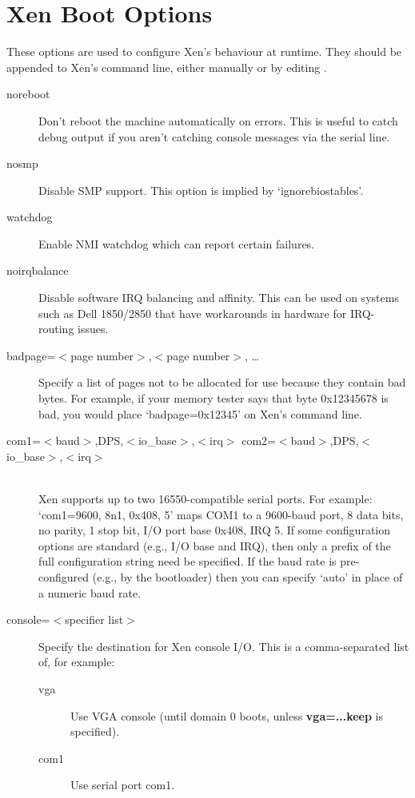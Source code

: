 \documentclass[11pt,twoside,final,openright]{report}
\begin{document}
\section{Xen Boot Options}
\label{s:xboot}

These options are used to configure Xen's behaviour at runtime.  They
should be appended to Xen's command line, either manually or by
editing .

\begin{description}
\item [ noreboot ] Don't reboot the machine automatically on errors.
  This is useful to catch debug output if you aren't catching console
  messages via the serial line.
\item [ nosmp ] Disable SMP support.  This option is implied by
  `ignorebiostables'.
\item [ watchdog ] Enable NMI watchdog which can report certain
  failures.
\item [ noirqbalance ] Disable software IRQ balancing and affinity.
  This can be used on systems such as Dell 1850/2850 that have
  workarounds in hardware for IRQ-routing issues.
\item [ badpage=$<$page number$>$,$<$page number$>$, \ldots ] Specify
  a list of pages not to be allocated for use because they contain bad
  bytes. For example, if your memory tester says that byte 0x12345678
  is bad, you would place `badpage=0x12345' on Xen's command line.
\item [ com1=$<$baud$>$,DPS,$<$io\_base$>$,$<$irq$>$
  com2=$<$baud$>$,DPS,$<$io\_base$>$,$<$irq$>$ ] \mbox{}\\
  Xen supports up to two 16550-compatible serial ports.  For example:
  `com1=9600, 8n1, 0x408, 5' maps COM1 to a 9600-baud port, 8 data
  bits, no parity, 1 stop bit, I/O port base 0x408, IRQ 5.  If some
  configuration options are standard (e.g., I/O base and IRQ), then
  only a prefix of the full configuration string need be specified. If
  the baud rate is pre-configured (e.g., by the bootloader) then you
  can specify `auto' in place of a numeric baud rate.
\item [ console=$<$specifier list$>$ ] Specify the destination for Xen
  console I/O.  This is a comma-separated list of, for example:
  \begin{description}
  \item[ vga ] Use VGA console (until domain 0 boots, unless {\bf
  vga=...keep } is specified).
  \item[ com1 ] Use serial port com1.

\end{description}
\end{description}
\end{document}
